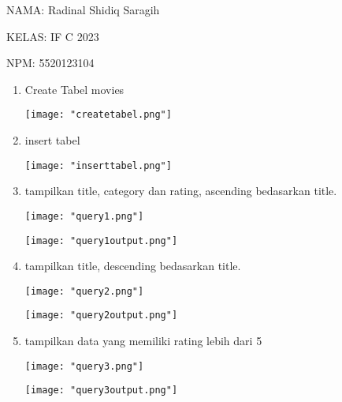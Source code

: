 \documentclass[12pt,a4paper]{article}
\date{}
\begin{document}
NAMA: Radinal Shidiq Saragih

KELAS: IF C 2023

NPM: 5520123104

\begin{enumerate}

  \item Create Tabel movies

  \texttt{[image: "createtabel.png"]}

  \item insert tabel

  \texttt{[image: "inserttabel.png"]}

  \item tampilkan title, category dan rating, ascending bedasarkan title.

  \begin{center}
  \texttt{[image: "query1.png"]}

  \texttt{[image: "query1output.png"]}
  \end{center}

  \item tampilkan title, descending bedasarkan title.

  \begin{center}
  \texttt{[image: "query2.png"]}

  \texttt{[image: "query2output.png"]}
  \end{center}

\item tampilkan data yang memiliki rating lebih dari 5

  \begin{center}
  \texttt{[image: "query3.png"]}

  \texttt{[image: "query3output.png"]}
  \end{center}


\end{enumerate}
\end{document}
